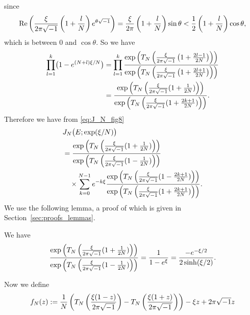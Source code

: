 since
\begin{equation*}
  \operatorname{Re}\left(\frac{\xi}{2\pi\sqrt{-1}}\left(1+\frac{l}{N}\right)e^{\theta\sqrt{-1}}\right)
  =
  \frac{\xi}{2\pi}\left(1+\frac{l}{N}\right)\sin\theta
  <
  \frac{1}{2}\left(1+\frac{l}{N}\right)\cos\theta,
\end{equation*}
which is between $0$ and $\cos\theta$.
So we have
\begin{equation*}
\begin{split}
  \prod_{l=1}^{k}\bigl(1-e^{(N+l)\xi/N}\bigr)
  &=
  \prod_{l=1}^{k}
  \frac{\exp\left(T_{N}\left(\frac{\xi}{2\pi\sqrt{-1}}\left(1+\frac{2l-1}{2N}\right)\right)\right)}
       {\exp\left(T_{N}\left(\frac{\xi}{2\pi\sqrt{-1}}\left(1+\frac{2l+1}{2N}\right)\right)\right)}
  \\
  &=
  \frac{\exp\left(T_{N}\left(\frac{\xi}{2\pi\sqrt{-1}}(1+\frac{1}{2N})\right)\right)}
       {\exp\left(T_{N}\left(\frac{\xi}{2\pi\sqrt{-1}}(1+\frac{2k+1}{2N})\right)\right)}.
\end{split}
\end{equation*}
Therefore we have from \eqref{eq:J_N_fig8}
\begin{equation*}
\begin{split}
  &J_N\bigl(E;\exp(\xi/N)\bigr)
  \\
  &=
  \frac{\exp\left(T_{N}\left(\frac{\xi}{2\pi\sqrt{-1}}(1+\frac{1}{2N})\right)\right)}
       {\exp\left(T_{N}\left(\frac{\xi}{2\pi\sqrt{-1}}(1-\frac{1}{2N})\right)\right)}
  \\
  &\quad\times
  \sum_{k=0}^{N-1}
  e^{-k\xi}
  \frac{\exp\left(T_{N}\left(\frac{\xi}{2\pi\sqrt{-1}}(1-\frac{2k+1}{2N})\right)\right)}
       {\exp\left(T_{N}\left(\frac{\xi}{2\pi\sqrt{-1}}(1+\frac{2k+1}{2N})\right)\right)}.
\end{split}
\end{equation*}
We use the following lemma, a proof of which is given in Section~\ref{sec:proofs_lemmas}.
\begin{lem}\label{lem:T_special}
We have
\begin{equation*}
  \frac{\exp\left(T_{N}\left(\frac{\xi}{2\pi\sqrt{-1}}(1+\frac{1}{2N})\right)\right)}
       {\exp\left(T_{N}\left(\frac{\xi}{2\pi\sqrt{-1}}(1-\frac{1}{2N})\right)\right)}
  =
  \frac{1}{1-e^{\xi}}
  =
  \frac{-e^{-\xi/2}}{2\sinh(\xi/2)}.
\end{equation*}
\end{lem}
\par
Now we define
\begin{equation*}
  f_{N}(z)
  :=
  \frac{1}{N}
  \left(
    T_{N}\left(\frac{\xi(1-z)}{2\pi\sqrt{-1}}\right)
    -
    T_{N}\left(\frac{\xi(1+z)}{2\pi\sqrt{-1}}\right)
  \right)
  -\xi z
  +2\pi\sqrt{-1} z
\end{equation*}
